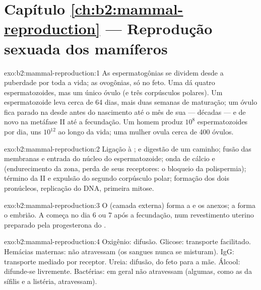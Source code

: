 \section*{Capítulo \ref{ch:b2:mammal-reproduction} --- Reprodução sexuada dos mamíferos}

\begin{solution}{exo:b2:mammal-reproduction:1}
As espermatogônias se dividem desde a puberdade por toda a vida; as
ovogônias, só no feto. Uma  dá quatro espermatozoides, mas um
único óvulo (e três corpúsculos polares). Um espermatozoide leva cerca
de 64 dias, mais duas semanas de maturação; um óvulo fica parado na
 desde antes do nascimento até o mês de sua  ---
décadas --- e de novo na metáfase II até a fecundação. Um homem produz
$10^{8}$ espermatozoides por dia, uns $10^{12}$ ao longo da vida; uma
mulher ovula cerca de 400 óvulos.
\end{solution}

\begin{solution}{exo:b2:mammal-reproduction:2}
Ligação à ;  e digestão de um caminho;
fusão das membranas e entrada do núcleo do espermatozoide; onda de
cálcio e  (endurecimento da zona, perda de seus
receptores: o bloqueio da polispermia); término da  II e
expulsão do segundo corpúsculo polar; formação dos dois pronúcleos,
replicação do DNA, primeira mitose.
\end{solution}

\begin{solution}{exo:b2:mammal-reproduction:3}
O  (camada externa) forma a  e os anexos; a  forma o embrião. A  começa no dia 6 ou 7
após a fecundação, num revestimento uterino preparado pela progesterona
do .
\end{solution}

\begin{solution}{exo:b2:mammal-reproduction:4}
Oxigênio: difusão. Glicose: transporte facilitado. Hemácias maternas:
não atravessam (os sangues nunca se misturam). IgG: transporte mediado
por receptor. Ureia: difusão, do feto para a mãe. Álcool: difunde-se
livremente. Bactérias: em geral não atravessam (algumas, como as da
sífilis e a listéria, atravessam).
\end{solution}

